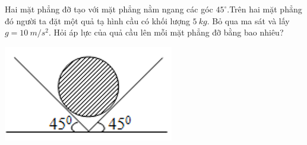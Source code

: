 \begin{enumerate}[label=\bfseries Câu \arabic*:]
	\cauhoi
	{Hai mặt phẳng đỡ tạo với mặt phẳng nằm ngang các góc $45^{\circ}$.Trên hai mặt phẳng đó người ta đặt một quả tạ hình cầu có khối lượng $\SI{5}{kg}$. Bỏ qua ma sát và lấy $g=\SI[parse-numbers=false]{10}{m/s^2}$. Hỏi áp lực của quả cầu lên mỗi mặt phẳng đỡ bằng bao nhiêu?
		\begin{center}
			\includegraphics[scale=0.8]{../figs/VN10-2021-PH-TP020-5.png}
		\end{center}
	}
	

\end{enumerate}
